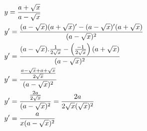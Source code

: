 \begin{ex}
\begin{align}
&y=\frac{a+\sqrt{x}}{a-\sqrt{x}}\nonumber\\
&y'=\frac{(a-\sqrt{x})(a+\sqrt{x})'-(a-\sqrt{x})'(a+\sqrt{x})}{(a-\sqrt{x})^2}\nonumber\\
&y'=\frac{(a-\sqrt{x}).\frac{1}{2\sqrt{x}}-\left(\frac{-1}{2\sqrt{x}}\right)(a+\sqrt{x})}{(a-\sqrt{x})^2}\nonumber\\
&y'=\frac{\frac{a-\sqrt{x}+a+\sqrt{x}}{2\sqrt{x}}}{(a-\sqrt{x})^2}\nonumber\\
&y'=\frac{\frac{2a}{2\sqrt{x}}}{(a-\sqrt{x})^2}=\frac{2a}{2\sqrt{x}(\-\sqrt{x})^2}\nonumber\\
&y'=\frac{a}{x(a-\sqrt{x})^2}\nonumber
\end{align}
\end{ex}